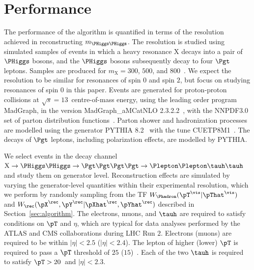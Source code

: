 \section{Performance}
\label{sec:performance}

The performance of the algorithm is quantified in terms of the resolution achieved in reconstructing $m_{\PHiggs\PHiggs}$.
The resolution is studied using simulated samples of events
in which a heavy resonance $\textrm{X}$ decays into a pair of $\PHiggs$ bosons,
and the $\PHiggs$ bosons subsequently decay to four $\Pgt$ leptons.
Samples are produced for $m_{\textrm{X}} = 300$, $500$, and $800$~\GeV.
We expect the resolution to be similar for resonances of spin $0$ and spin $2$,
but focus on studying resonances of spin $0$ in this paper.
Events are generated for proton-proton collisions at $\sqrt{s} = 13$~\TeV centre-of-mass energy,
using the leading order program MadGraph, in the version MadGraph\_aMCatNLO 2.3.2.2~\cite{MadGraph_aMCatNLO},
with the NNPDF3.0 set of parton distribution functions~\cite{NNPDF1,NNPDF2,NNPDF3}.
Parton shower and hadronization processes are modelled using the generator PYTHIA 8.2~\cite{pythia8} with the tune CUETP8M1~\cite{PYTHIA_CUETP8M1tune_CMS}.
The decays of $\Pgt$ leptons, including polarization effects, are modelled by PYTHIA.

We select events in the decay channel $\textrm{X} \to \PHiggs\PHiggs \to \Pgt\Pgt\Pgt\Pgt \to \Plepton\Plepton\tauh\tauh$
and study them on generator level.
Reconstruction effects are simulated by varying the generator-level quantities within their experimental resolution,
which we perform by randomly sampling from the TF 
$W_{\Phadron}( \pT^{\vis} | \pThat^{\vis} )$
and
$W_{\rec}( \pX^{\rec},\pY^{\rec} | \pXhat^{\rec},\pYhat^{\rec} )$
described in Section~\ref{sec:algorithm}.
The electrons, muons, and $\tauh$ are required to satisfy conditions on $\pT$ and $\eta$, 
which are typical for data analyses performed by the ATLAS and CMS collaborations during LHC Run $2$.
Electrons (muons) are required to be within $\vert\eta\vert < 2.5$ ($\vert\eta\vert < 2.4$).
The lepton of higher (lower) $\pT$ is required to pass a $\pT$ threshold of $25$ ($15$)~\GeV.
Each of the two $\tauh$ is required to satisfy $\pT > 20$~\GeV and $\vert\eta\vert < 2.3$.

